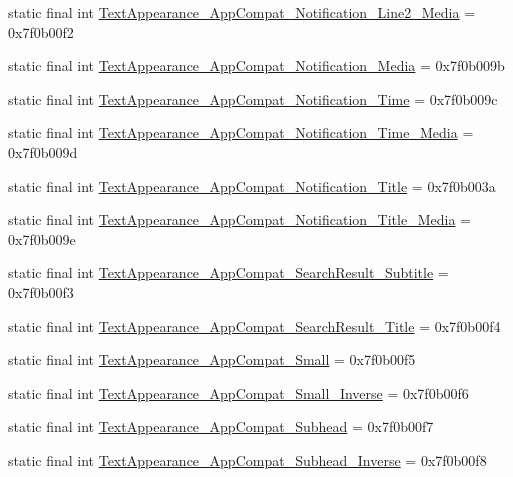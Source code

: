 \begin{CompactItemize}
static final int \hyperlink{classandroid_1_1support_1_1v7_1_1appcompat_1_1_r_1_1style_38044bcef9b3f171aa195d03be3f0797}{TextAppearance\_\-AppCompat\_\-Notification\_\-Line2\_\-Media} = 0x7f0b00f2
\item 
static final int \hyperlink{classandroid_1_1support_1_1v7_1_1appcompat_1_1_r_1_1style_71687ac67f71c62c224c993ef11680b3}{TextAppearance\_\-AppCompat\_\-Notification\_\-Media} = 0x7f0b009b
\item 
static final int \hyperlink{classandroid_1_1support_1_1v7_1_1appcompat_1_1_r_1_1style_7b119d6206373cdf4ce7327c6783bfbb}{TextAppearance\_\-AppCompat\_\-Notification\_\-Time} = 0x7f0b009c
\item 
static final int \hyperlink{classandroid_1_1support_1_1v7_1_1appcompat_1_1_r_1_1style_ae4e588e6968578eeb7b34345dd7780c}{TextAppearance\_\-AppCompat\_\-Notification\_\-Time\_\-Media} = 0x7f0b009d
\item 
static final int \hyperlink{classandroid_1_1support_1_1v7_1_1appcompat_1_1_r_1_1style_7e2c5d1f4a01e7e462aa0ea27e8cbd68}{TextAppearance\_\-AppCompat\_\-Notification\_\-Title} = 0x7f0b003a
\item 
static final int \hyperlink{classandroid_1_1support_1_1v7_1_1appcompat_1_1_r_1_1style_7ccd4d7e916a8010f62efbd5c133de23}{TextAppearance\_\-AppCompat\_\-Notification\_\-Title\_\-Media} = 0x7f0b009e
\item 
static final int \hyperlink{classandroid_1_1support_1_1v7_1_1appcompat_1_1_r_1_1style_849cd1652cbed588e888589dbdedb962}{TextAppearance\_\-AppCompat\_\-SearchResult\_\-Subtitle} = 0x7f0b00f3
\item 
static final int \hyperlink{classandroid_1_1support_1_1v7_1_1appcompat_1_1_r_1_1style_eac61b9965fa91c050200e7fda1d19a0}{TextAppearance\_\-AppCompat\_\-SearchResult\_\-Title} = 0x7f0b00f4
\item 
static final int \hyperlink{classandroid_1_1support_1_1v7_1_1appcompat_1_1_r_1_1style_42da54f6a9edd6d308f97ea23b949312}{TextAppearance\_\-AppCompat\_\-Small} = 0x7f0b00f5
\item 
static final int \hyperlink{classandroid_1_1support_1_1v7_1_1appcompat_1_1_r_1_1style_b9adaede196b6d035ea43b9fdab132a5}{TextAppearance\_\-AppCompat\_\-Small\_\-Inverse} = 0x7f0b00f6
\item 
static final int \hyperlink{classandroid_1_1support_1_1v7_1_1appcompat_1_1_r_1_1style_4c94a0a71535bed8ccd2dbaf9029c665}{TextAppearance\_\-AppCompat\_\-Subhead} = 0x7f0b00f7
\item 
static final int \hyperlink{classandroid_1_1support_1_1v7_1_1appcompat_1_1_r_1_1style_f6cf26bdcba6fae1260a0a6ccb3a27b0}{TextAppearance\_\-AppCompat\_\-Subhead\_\-Inverse} = 0x7f0b00f8

\end{CompactItemize}
